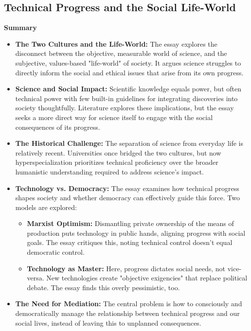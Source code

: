 \documentclass[11pt,fleqn]{book}
\begin{document}
\subsection{Technical Progress and the Social Life-World}
\textbf{Summary}

\begin{itemize}
\item \textbf{The Two Cultures and the Life-World:} The essay explores the disconnect between the objective, measurable world of science, and the subjective, values-based "life-world" of society. It argues science struggles to directly inform the social and ethical issues that arise from its own progress. 

\item \textbf{Science and Social Impact:} Scientific knowledge equals power, but often technical power with few built-in guidelines for integrating discoveries into society thoughtfully. Literature explores these implications, but the essay seeks a more direct way for science itself to engage with the social consequences of its progress.

\item \textbf{The Historical Challenge:} The separation of science from everyday life is relatively recent. Universities once bridged the two cultures, but now hyperspecialization prioritizes technical proficiency over the broader humanistic understanding required to address science's impact.

\item \textbf{Technology vs. Democracy:} The essay examines how technical progress shapes society and whether democracy can effectively guide this force. Two models are explored:
    \begin{itemize}
        \item \textbf{Marxist Optimism:} Dismantling private ownership of the means of production puts technology in public hands, aligning progress with social goals. The essay critiques this, noting technical control doesn't equal democratic control.

        \item \textbf{Technology as Master:} Here, progress dictates social needs, not vice-versa.  New technologies create "objective exigencies" that replace political debate. The essay finds this overly pessimistic, too.
    \end{itemize}

\item \textbf{The Need for Mediation:}  The central problem is how to consciously and democratically manage the relationship between technical progress and our social lives, instead of leaving this to unplanned consequences.


\end{itemize}
\end{document}

